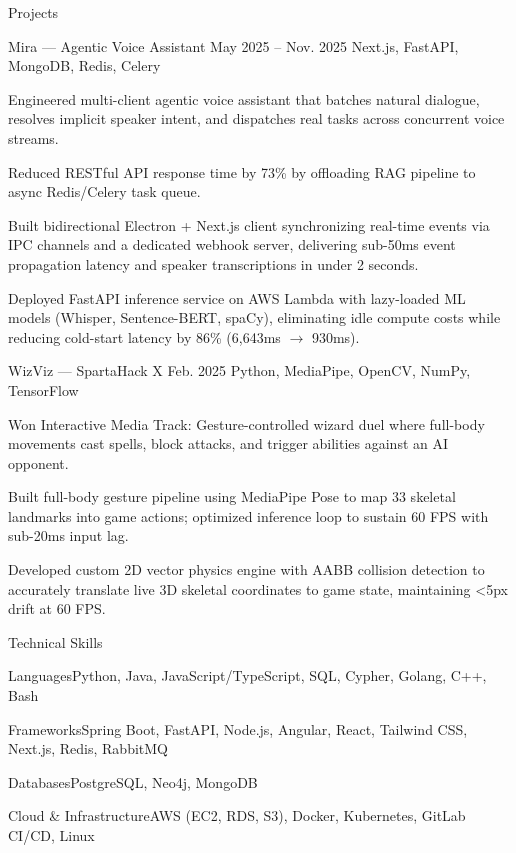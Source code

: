 \documentclass[
	11pt
]{../../../resume}
\begin{document}
	\begin{rSection}{P}{rojects}
		\begin{rSectionEntry}
			{Mira --- Agentic Voice Assistant}
			{May 2025 -- Nov. 2025}
			{}
			{Next.js, FastAPI, MongoDB, Redis, Celery}
			{}

			\item Engineered multi-client agentic voice assistant that batches natural dialogue, resolves implicit speaker intent, and dispatches real tasks across concurrent voice streams.
			\item Reduced RESTful API response time by 73\% by offloading RAG pipeline to async Redis/Celery task queue.
			\item Built bidirectional Electron + Next.js client synchronizing real-time events via IPC channels and a dedicated webhook server, delivering sub-50ms event propagation latency and speaker transcriptions in under 2 seconds.
			\item Deployed FastAPI inference service on AWS Lambda with lazy-loaded ML models (Whisper, Sentence-BERT, spaCy), eliminating idle compute costs while reducing cold-start latency by 86\% (6{,}643ms $\rightarrow$ 930ms).
		\end{rSectionEntry}

		\begin{rSectionEntry}
			{WizViz --- SpartaHack X}
			{Feb. 2025}
			{}
			{Python, MediaPipe, OpenCV, NumPy, TensorFlow}
			{}

			\item Won Interactive Media Track: Gesture-controlled wizard duel where full-body movements cast spells, block attacks, and trigger abilities against an AI opponent.
			\item Built full-body gesture pipeline using MediaPipe Pose to map 33 skeletal landmarks into game actions; optimized inference loop to sustain 60 FPS with sub-20ms input lag.
			\item Developed custom 2D vector physics engine with AABB collision detection to accurately translate live 3D skeletal coordinates to game state, maintaining \textless5px drift at 60 FPS.
		\end{rSectionEntry}
	\end{rSection}

	\begin{rSection}{T}{echnical Skills}
		\begin{rSet}{Languages}{Python, Java, JavaScript/TypeScript, SQL, Cypher, Golang, C++, Bash}
		\end{rSet}
		\begin{rSet}{Frameworks}{Spring Boot, FastAPI, Node.js, Angular, React, Tailwind CSS, Next.js, Redis, RabbitMQ}
		\end{rSet}
		\begin{rSet}{Databases}{PostgreSQL, Neo4j, MongoDB}
		\end{rSet}
		\begin{rSet}{Cloud \& Infrastructure}{AWS (EC2, RDS, S3), Docker, Kubernetes, GitLab CI/CD, Linux}
		\end{rSet}
	\end{rSection}
\end{document}
